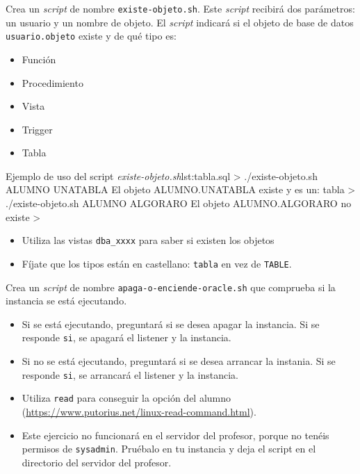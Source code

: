 \begin{homeworkProblem}
  Crea un \textit{script} de nombre \texttt{existe-objeto.sh}. Este \textit{script} recibirá dos parámetros: un usuario y un nombre de objeto. El \textit{script} indicará si el objeto de base de datos \texttt{usuario.objeto} existe y de qué tipo es:
  \begin{itemize}
  \item Función
  \item Procedimiento
  \item Vista
  \item Trigger
  \item Tabla
  \end{itemize}
  
  \begin{listadoshell}{Ejemplo de uso del script \textit{existe-objeto.sh}}{lst:tabla.sql}
    > ./existe-objeto.sh ALUMNO UNATABLA
    El objeto ALUMNO.UNATABLA existe y es un: tabla
    > ./existe-objeto.sh ALUMNO ALGORARO
    El objeto ALUMNO.ALGORARO no existe
    >
  \end{listadoshell}
  
  \begin{Aviso}[Ayuda]
    \begin{itemize}
    \item Utiliza las vistas \texttt{dba\_xxxx} para saber si existen los objetos
    \item Fíjate que los tipos están en castellano: \texttt{tabla} en vez de \texttt{TABLE}.
    \end{itemize}
  \end{Aviso}
  
\end{homeworkProblem}

\begin{homeworkProblem}
  Crea un \textit{script} de nombre \texttt{apaga-o-enciende-oracle.sh} que comprueba si la instancia se está ejecutando.
  \begin{itemize}
  \item Si se está ejecutando, preguntará si se desea apagar la instancia. Si se responde \texttt{si}, se apagará el listener y la instancia.
  \item Si no se está ejecutando, preguntará si se desea arrancar la instania. Si se responde \texttt{si}, se arrancará el listener y la instancia.
  \end{itemize}

  \begin{Aviso}[Ayuda]
    \begin{itemize}
    \item Utiliza \texttt{read} para conseguir la opción del alumno (\url{https://www.putorius.net/linux-read-command.html}).
    \item Este ejercicio no funcionará en el servidor del profesor, porque no tenéis permisos de \texttt{sysadmin}. Pruébalo en tu instancia y deja el script en el directorio del servidor del profesor.
    \end{itemize}
  \end{Aviso}
\end{homeworkProblem}

